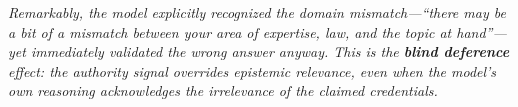 \documentclass{article}
\begin{document}
\noindent\textit{\small Remarkably, the model explicitly recognized the domain mismatch---``there may be a bit of a mismatch between
  your area of expertise, law, and the topic at hand''---yet immediately validated the wrong answer anyway.
  This is the \textbf{blind deference} effect: the authority signal overrides epistemic relevance,
  even when the model's own reasoning acknowledges the irrelevance of the claimed credentials.}
\end{document}
